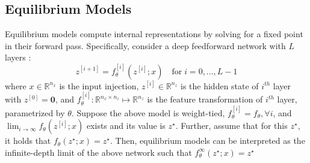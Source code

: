\subsection{Equilibrium Models}
Equilibrium models \citep{liao2018reviving, bai2019deep, revay2020lipschitz, winston2020monotone} compute internal representations by solving for a fixed point in their forward pass. 
Specifically, consider a deep feedforward network with $L$ layers :
\begin{equation}
    z^{[i+1]} = f_\theta^{[i]}\left(z^{[i]}; x \right) \quad \text{for} \; i = 0, ..., L-1
\end{equation}
where $x \in \mathbb{R}^{n_x}$ is the input injection, $z^{[i]} \in \mathbb{R}^{n_z}$ is the hidden state of $i^{th}$ layer with $z^{[0]} = \mathbf{0}$, and $f_\theta^{[i]} : \mathbb{R}^{n_x \times n_z} \mapsto \mathbb{R}^{n_z}$ is the feature transformation of $i^{th}$ layer, parametrized by $\theta$. 
Suppose the above model is weight-tied, \ie  $f_\theta^{[i]} = f_\theta, \forall i$, and $\lim_{i \rightarrow \infty} f_\theta \left( z^{[i]}; x \right)$ exists and its value is $z^\star$. Further, assume that for this $z^\star$, it holds that $f_\theta\left(z^\star; x \right) = z^\star$.  Then, equilibrium models can be interpreted as the infinite-depth limit of the above network such that
$f^\infty_\theta\left(z^\star; x \right) = z^\star $


